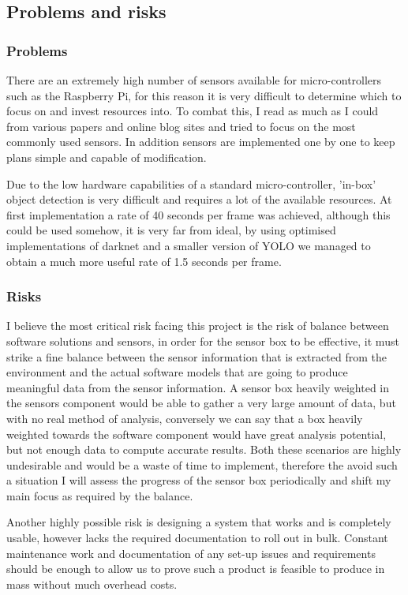\documentclass[11pt]{article}
\begin{document}
\subsection{Problems and risks}\label{problems-and-risks}

\subsubsection{Problems}\label{problems}
There are an extremely high number of sensors available for micro-controllers such as the Raspberry Pi, for this reason it is very difficult to determine which to focus on and invest resources into. To combat this, I read as much as I could from various papers and online blog sites and tried to focus on the most commonly used sensors. In addition sensors are implemented one by one to keep plans simple and capable of modification.

Due to the low hardware capabilities of a standard micro-controller, 'in-box' object detection is very difficult and requires a lot of the available resources. At first implementation a rate of 40 seconds per frame was achieved, although this could be used somehow, it is very far from ideal, by using optimised implementations of darknet and a smaller version of YOLO we managed to obtain a much more useful rate of 1.5 seconds per frame.

\subsubsection{Risks}\label{risks}
I believe the most critical risk facing this project is the risk of balance between software solutions and sensors, in order for the sensor box to be effective, it must strike a fine balance between the sensor information that is extracted from the environment and the actual software models that are going to produce meaningful data from the sensor information. A sensor box heavily weighted in the sensors component would be able to gather a very large amount of data, but with no real method of analysis, conversely we can say that a box heavily weighted towards the software component would have great analysis potential, but not enough data to compute accurate results. Both these scenarios are highly undesirable and would be a waste of time to implement, therefore the avoid such a situation I will assess the progress of the sensor box periodically and shift my main focus as required by the balance.

Another highly possible risk is designing a system that works and is completely usable, however lacks the required documentation to roll out in bulk. Constant maintenance work and documentation of any set-up issues and requirements should be enough to allow us to prove such a product is feasible to produce in mass without much overhead costs.
\end{document}

